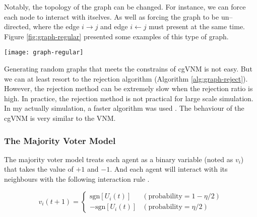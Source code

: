 \documentclass[11pt,twoside]{report}
\begin{document}
Notably, the topology of the graph can be changed. For instance, we can force each node to interact with itselves. As well as forcing the graph to be un--directed, where the edge $i \rightarrow j$ and edge $i \leftarrow j$ must present at the same time. Figure \ref{fig:graph-regular} presented some examples of this type of graph.

\begin{SCfigure}
  \texttt{[image: graph-regular]}
  \caption[Examples of graphs for vectorial network model with topological constrains]{Graph and matrix representation of the vectorial network model with extra topological constrains. The sub--figures have increasing connection number ($K$) from left to right. The top row illustrate the relationship between 5 agents. And the arrow from $i$ to $j$ indicates that agent $i$ will align with agent $j$. The bottom row indicates the adjacency matrices of these graphs. }
  \label{fig:graph-regular}
\end{SCfigure}

Generating random graphs that meets the constrains of cgVNM is not easy. But we can at least resort to the rejection algorithm (Algorithm \ref{alg:graph-reject}).
However, the rejection method can be extremely slow when the rejection ratio is high. In practice, the rejection method is not practical for large scale simulation. In my actually simulation, a faster algorithm was used \cite{kim2003book}. The behaviour of the cgVNM is very similar to the VNM.

\subsubsection*{The Majority Voter Model}

The majority voter model
 treats each agent as a binary variable (noted as $v_i$) that takes the value of $+1$ and $-1$. And each agent will interact with its neighbours with the following interaction rule \cite{pimentel2008PRE}. 
 
$$
v_i(t+1) = \left\{ \begin{array}{ll}
\mathrm{sgn} \left[ U_i(t) \right]
& (\textrm{probability} = 1-\eta/2) \\[1em]
-\mathrm{sgn} \left[ U_i(t) \right]
& (\textrm{probability} = \eta/2)
\end{array}
\right.
$$
\end{document}
